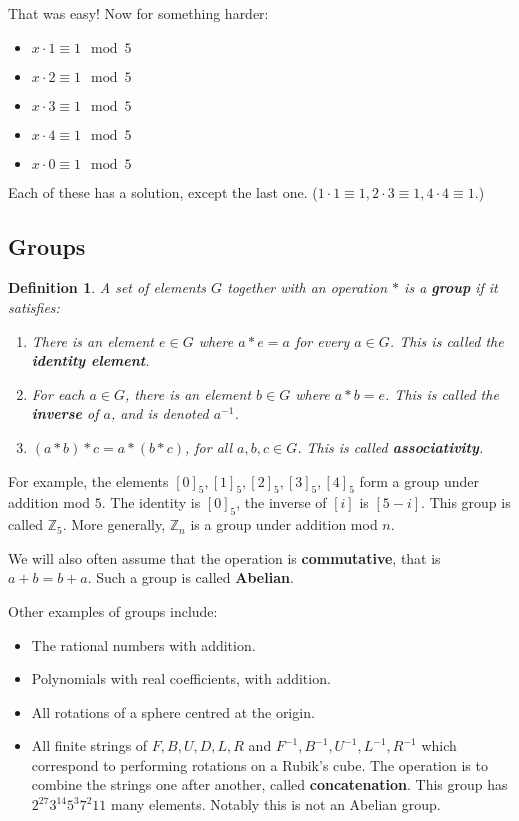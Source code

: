 \documentclass[11pt]{article}
\newtheorem{dfn}[thm]{Definition}
\theoremstyle{definition}
\numberwithin{thm}{section}
\begin{document}
That was easy! Now for something harder:

\begin{itemize}
	\item $x \cdot 1 \equiv 1 \mod 5$
    \item $x \cdot 2 \equiv 1 \mod 5$
    \item $x \cdot 3 \equiv 1 \mod 5$
    \item $x \cdot 4 \equiv 1 \mod 5$
    \item $x \cdot 0 \equiv 1 \mod 5$
\end{itemize}

Each of these has a solution, except the last one. ($1 \cdot 1 \equiv 1, 2 \cdot 3 \equiv 1, 4 \cdot 4 \equiv 1$.)

\subsection{Groups}

\begin{dfn} A set of elements $G$ together with an operation $*$ is a \textbf{group} if it satisfies:
	\begin{enumerate}
    	\item There is an element $e \in G$ where $a * e = a$ for every $a \in G$. This is called the \textbf{identity element}.
        \item For each $a \in G$, there is an element $b \in G$ where $a * b = e$. This is called the \textbf{inverse} of $a$, and is denoted $a^{-1}$.
    	\item $(a * b)*c = a * (b * c)$, for all $a,b,c \in G$. This is called \textbf{associativity}.
    \end{enumerate}
\end{dfn}

For example, the elements $[0]_5, [1]_5, [2]_5, [3]_5, [4]_5$ form a group under addition mod $5$. The identity is $[0]_5$, the inverse of $[i]$ is $[5-i]$. This group is called $\mathbb{Z}_5$. More generally, $\mathbb{Z}_n$ is a group under addition mod $n$.

We will also often assume that the operation is \textbf{commutative}, that is $a+b = b+a$. Such a group is called \textbf{Abelian}.

Other examples of groups include:
\begin{itemize}
	\item The rational numbers with addition.
    \item Polynomials with real coefficients, with addition. 
    \item All rotations of a sphere centred at the origin.
    \item All finite strings of $F,B,U,D,L,R$ and $F^{-1}, B^{-1}, U^{-1},L^{-1},R^{-1}$ which correspond to performing rotations on a Rubik's cube. The operation is to combine the strings one after another, called \textbf{concatenation}. This group has $2^{27}3^{14}5^3 7^2 11$ many elements. Notably this is not an Abelian group.
\end{itemize}
\end{document}
